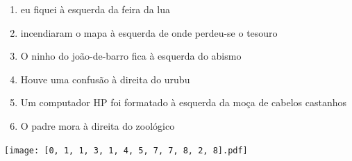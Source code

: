 \documentclass[12pt]{article}
\begin{document}
		 

\pagebreak


	\begin{enumerate}
		  \sffamily %
		  \large %


\vfill \item
eu fiquei	%
à esquerda
da feira da lua	%

\vfill \item
incendiaram o mapa	%
à esquerda
de onde perdeu-se o tesouro	%

\vfill \item
O ninho do joão-de-barro fica	%
à esquerda
do abismo	%

\vfill \item
Houve uma confusão	%
à direita
do urubu	%

\vfill \item
Um computador HP foi formatado	%
à esquerda
da moça de cabelos castanhos	%

\vfill \item
O padre mora	%
à direita
do zoológico	%
	\end{enumerate}
		  
		  \hfill

		  \vfill

\texttt{[image: [0, 1, 1, 3, 1, 4, 5, 7, 7, 8, 2, 8].pdf]}


	\hfill	  	  


\pagebreak			
\end{document}
